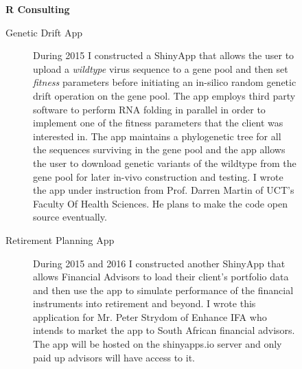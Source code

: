 \newpage
\begin{description}\item[] \begin{description}\item[] {\large \bf  R Consulting }
\begin{description}
 \item[ Genetic Drift App   ]  During 2015 I constructed a ShinyApp
 that allows the user to upload a {\it wildtype} virus sequence  to a gene pool and then set {\it fitness} parameters before
 initiating an in-silico random genetic drift operation on the gene pool. The app employs third party software
 to perform RNA folding in parallel in order to implement one of the fitness parameters that the client was interested in.
 The app maintains a phylogenetic tree for all the sequences surviving in the gene pool and the app allows
 the user to download genetic variants of the wildtype from the gene pool for later in-vivo construction and testing.
 I wrote the app under instruction from Prof. Darren Martin of UCT's Faculty Of Health Sciences. 
 He plans to make the code open source eventually.

 \item[ Retirement Planning  App   ]  During 2015 and 2016 I constructed another ShinyApp
 that allows Financial Advisors to load their client's portfolio data and then use the app to simulate
 performance of the financial instruments into retirement and beyond. I wrote this application for Mr. Peter Strydom of Enhance IFA
 who intends to market the app to South African financial advisors. The app will be hosted on the shinyapps.io server
 and only paid up advisors will have access to it.
 
 \end{description}
 \end{description}
\end{description}


